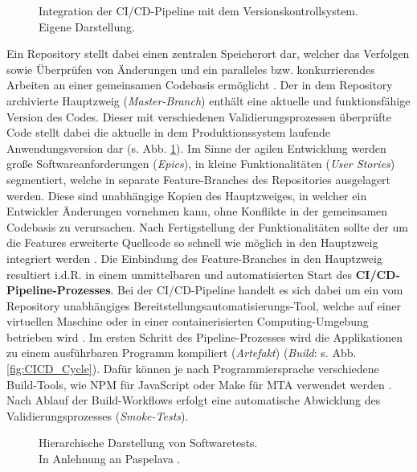 \begin{center}
	\begin{figure}[H]
		\centering
		\caption[Integration der CI/CD-Pipeline mit dem Versionskontrollsystem]{Integration der CI/CD-Pipeline mit dem Versionskontrollsystem. Eigene Darstellung.}
		\label{fig:VCS}
	\end{figure}
\end{center}
\vspace*{-15mm}
Ein Repository stellt dabei einen zentralen Speicherort dar, welcher das Verfolgen sowie Überprüfen von Änderungen und ein paralleles bzw. konkurrierendes Arbeiten an einer gemeinsamen Codebasis ermöglicht \cite[31]{Loeliger.2012}. Der in dem Repository archivierte Hauptzweig (\textit{Master-Branch}) enthält eine aktuelle und funktionsfähige Version des Codes. Dieser mit verschiedenen Validierungsprozessen überprüfte Code stellt dabei die aktuelle in dem Produktionssystem laufende Anwendungsversion dar (s. Abb. \ref{fig:VCS}). Im Sinne der agilen Entwicklung werden große Softwareanforderungen (\textit{Epics}), in kleine Funktionalitäten (\textit{User Stories}) segmentiert, welche in separate Feature-Branches des Repositories ausgelagert werden. Diese sind unabhängige Kopien des Hauptzweiges, in welcher ein Entwickler Änderungen vornehmen kann, ohne Konflikte in der gemeinsamen Codebasis zu verursachen. Nach Fertigstellung der Funktionalitäten sollte der um die Features erweiterte Quellcode so schnell wie möglich in den Hauptzweig integriert werden \cite[169]{Loeliger.2012}. Die Einbindung des Feature-Branches in den Hauptzweig resultiert i.d.R. in einem unmittelbaren und automatisierten Start des \textbf{CI/CD-Pipeline-Prozesses}. Bei der CI/CD-Pipeline handelt es sich dabei um ein vom Repository unabhängiges Bereitstellungsautomatisierungs-Tool, welche auf einer virtuellen Maschine oder in einer containerisierten Computing-Umgebung betrieben wird \cite[Kap. 1.2]{Labouardy.2021}. Im ersten Schritt des Pipeline-Prozesses wird die Applikationen zu einem ausführbaren Programm kompiliert (\textit{Artefakt}) (\textit{Build}: s. Abb. \ref{fig:CICD_Cycle}). Dafür können je nach Programmiersprache verschiedene Build-Tools, wie NPM für JavaScript oder Make für \ac{MTA} verwendet werden \cite[Kap. 7.1]{Labouardy.2021}. Nach Ablauf der Build-Workflows erfolgt eine automatische Abwicklung des Validierungsprozesses (\textit{Smoke-Tests}).
\begin{center}
	\begin{figure}[H]
		\centering
		\caption[Hierarchische Darstellung von Softwaretests]{Hierarchische Darstellung von Softwaretests.\\ \hspace{0.5cm}In Anlehnung an Paspelava \cite{Exposit.2021}.}
		\label{fig:Tests}
	\end{figure}
\end{center}

